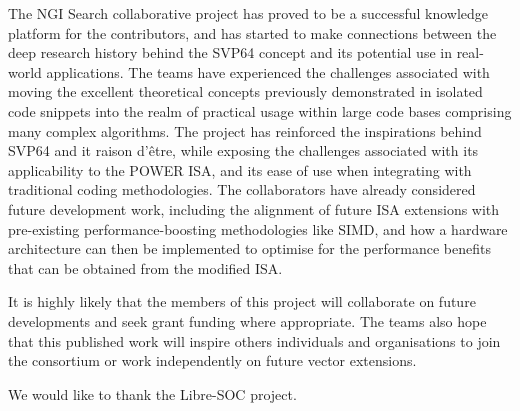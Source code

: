 The NGI Search collaborative project has proved to be a successful knowledge
platform for the contributors, and has started to make connections between the
deep research history behind the SVP64 concept and its potential use in
real-world applications. The teams have experienced the challenges associated
with moving the excellent theoretical concepts previously demonstrated in
isolated code snippets into the realm of practical usage within large code
bases comprising many complex algorithms. The project has reinforced the
inspirations behind SVP64 and it raison d’être, while exposing the challenges
associated with its applicability to the POWER ISA, and its ease of use when
integrating with traditional coding methodologies. The collaborators have
already considered future development work, including the alignment of future
ISA extensions with pre-existing performance-boosting methodologies like SIMD,
and how a hardware architecture can then be implemented to optimise for the
performance benefits that can be obtained from the modified ISA.

It is highly likely that the members of this project will collaborate on future
developments and seek grant funding where appropriate. The teams also hope that
this published work will inspire others individuals and organisations to join
the consortium or work independently on future vector extensions.

We would like to thank the Libre-SOC project.

